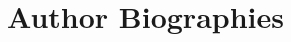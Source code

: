 \documentclass{scspaperproc}
\theoremstyle{scsthe}
\begin{document}








% 



\section*{Author Biographies}

\end{document}
